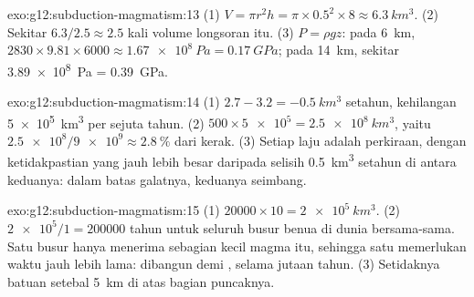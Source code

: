 \begin{solution}{exo:g12:subduction-magmatism:13}
(1) $V = \pi r^2 h = \pi \times 0.5^2 \times 8 \approx \qty{6.3}{km^3}$.
(2) Sekitar $6.3/2.5 \approx 2.5$ kali volume longsoran itu.
(3) $P = \rho g z$: pada \qty{6}{km}, $2830 \times 9.81 \times 6000 \approx
\qty{1.67e8}{Pa} = \qty{0.17}{GPa}$; pada \qty{14}{km}, sekitar
\qty{3.89e8}{Pa} = \qty{0.39}{GPa}.
\end{solution}

\begin{solution}{exo:g12:subduction-magmatism:14}
(1) $2.7 - 3.2 = \qty{-0.5}{km^3}$ setahun, kehilangan \qty{5e5}{km^3} per
sejuta tahun. (2) $500 \times \num{5e5} = \qty{2.5e8}{km^3}$, yaitu
$\num{2.5e8}/\num{9e9} \approx \qty{2.8}{\percent}$ dari kerak. (3) Setiap
laju adalah perkiraan, dengan ketidakpastian yang jauh lebih besar daripada
selisih \qty{0.5}{km^3} setahun di antara keduanya: dalam batas galatnya,
keduanya seimbang.
\end{solution}

\begin{solution}{exo:g12:subduction-magmatism:15}
(1) $\num{20000} \times 10 = \qty{2e5}{km^3}$. (2) $\num{2e5}/1 =
\num{200000}$ tahun untuk seluruh busur benua di dunia bersama-sama. Satu busur
hanya menerima sebagian kecil magma itu, sehingga satu  memerlukan waktu
jauh lebih lama:  dibangun  demi , selama jutaan tahun.
(3) Setidaknya batuan setebal \qty{5}{km} di atas bagian puncaknya.
\end{solution}

